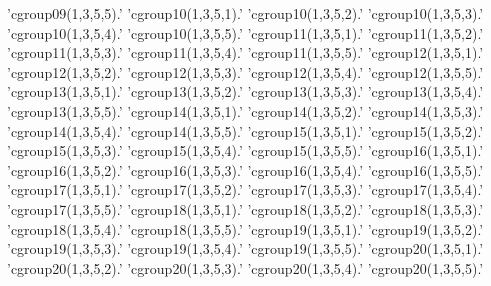 'cgroup09(1,3,5,5).'
'cgroup10(1,3,5,1).'
'cgroup10(1,3,5,2).'
'cgroup10(1,3,5,3).'
'cgroup10(1,3,5,4).'
'cgroup10(1,3,5,5).'
'cgroup11(1,3,5,1).'
'cgroup11(1,3,5,2).'
'cgroup11(1,3,5,3).'
'cgroup11(1,3,5,4).'
'cgroup11(1,3,5,5).'
'cgroup12(1,3,5,1).'
'cgroup12(1,3,5,2).'
'cgroup12(1,3,5,3).'
'cgroup12(1,3,5,4).'
'cgroup12(1,3,5,5).'
'cgroup13(1,3,5,1).'
'cgroup13(1,3,5,2).'
'cgroup13(1,3,5,3).'
'cgroup13(1,3,5,4).'
'cgroup13(1,3,5,5).'
'cgroup14(1,3,5,1).'
'cgroup14(1,3,5,2).'
'cgroup14(1,3,5,3).'
'cgroup14(1,3,5,4).'
'cgroup14(1,3,5,5).'
'cgroup15(1,3,5,1).'
'cgroup15(1,3,5,2).'
'cgroup15(1,3,5,3).'
'cgroup15(1,3,5,4).'
'cgroup15(1,3,5,5).'
'cgroup16(1,3,5,1).'
'cgroup16(1,3,5,2).'
'cgroup16(1,3,5,3).'
'cgroup16(1,3,5,4).'
'cgroup16(1,3,5,5).'
'cgroup17(1,3,5,1).'
'cgroup17(1,3,5,2).'
'cgroup17(1,3,5,3).'
'cgroup17(1,3,5,4).'
'cgroup17(1,3,5,5).'
'cgroup18(1,3,5,1).'
'cgroup18(1,3,5,2).'
'cgroup18(1,3,5,3).'
'cgroup18(1,3,5,4).'
'cgroup18(1,3,5,5).'
'cgroup19(1,3,5,1).'
'cgroup19(1,3,5,2).'
'cgroup19(1,3,5,3).'
'cgroup19(1,3,5,4).'
'cgroup19(1,3,5,5).'
'cgroup20(1,3,5,1).'
'cgroup20(1,3,5,2).'
'cgroup20(1,3,5,3).'
'cgroup20(1,3,5,4).'
'cgroup20(1,3,5,5).'
